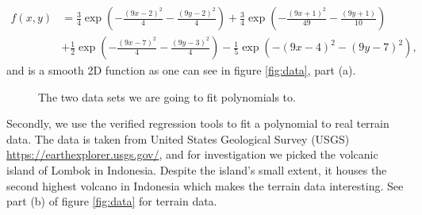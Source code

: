 \begin{align*}
f(x,y) &= \frac{3}{4}\exp{\left(-\frac{(9x-2)^2}{4} - \frac{(9y-2)^2}{4}\right)}+\frac{3}{4}\exp{\left(-\frac{(9x+1)^2}{49}- \frac{(9y+1)}{10}\right)} \\
&+\frac{1}{2}\exp{\left(-\frac{(9x-7)^2}{4} - \frac{(9y-3)^2}{4}\right)} -\frac{1}{5}\exp{\left(-(9x-4)^2 - (9y-7)^2\right) },
\end{align*}
and is a smooth 2D function as one can see in figure \eqref{fig:data}, part (a).

 \begin{figure} [H]%
    \centering
    \caption{The two data sets we are going to fit polynomials to.}%
    \label{fig:data}%
 \end{figure}

Secondly, we use the verified regression tools to fit a polynomial to real terrain data. The data is taken from United States Geological Survey (USGS) \url{https://earthexplorer.usgs.gov/}, and for investigation we picked the volcanic island of Lombok in Indonesia. Despite the island's small extent, it houses the second highest volcano in Indonesia which makes the terrain data interesting. See part (b) of figure \eqref{fig:data} for terrain data.

